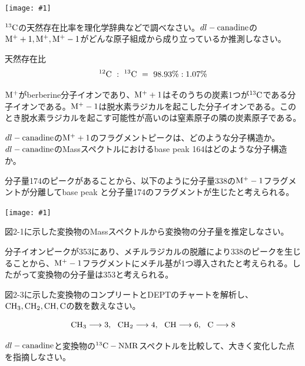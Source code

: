 \documentclass[a4paper,papersize,dvipdfmx]{jsarticle}
\newcommand{\pict}[2]{\begin{center} \texttt{[image: \#1]} \end{center}}   %
\begin{document}
\pict{imgs/kd04.jpeg}{12}

\begin{tcolorbox}[colback=white,colbacktitle=black,coltitle=white,title={問題5}]
$\rm ^{13}C$の天然存在比率を理化学辞典などで調べなさい。$dl-\rm canadine$の$\rm M^+ +1, M^+,M^+-1$がどんな原子組成から成り立っているか推測しなさい。
\end{tcolorbox}

天然存在比
\[\rm ^{12}C \ : \  ^{13}C \ = \ 98.93\% : 1.07\%\]


$\rm M^+$がberberine分子イオンであり、$\rm M^+ +1$はそのうちの炭素1つが$\rm ^{13}C$である分子イオンである。$\rm M^+-1$は脱水素ラジカルを起こした分子イオンである。このとき脱水素ラジカルを起こす可能性が高いのは窒素原子の隣の炭素原子である。

\begin{tcolorbox}[colback=white,colbacktitle=black,coltitle=white,title={問題6}]
$dl-\rm canadine$の$\rm M^+ +1$のフラグメントピークは、どのような分子構造か。$dl-\rm canadine$のMassスペクトルにおけるbase peak 164はどのような分子構造か。
\end{tcolorbox}

分子量174のピークがあることから、以下のように分子量338の$\rm M^+-1$フラグメントが分離してbase peak と分子量174のフラグメントが生じたと考えられる。

\pict{imgs/kd06.jpeg}{8}

\begin{tcolorbox}[colback=white,colbacktitle=black,coltitle=white,title={問題7}]
図2-1に示した変換物のMassスペクトルから変換物の分子量を推定しなさい。
\end{tcolorbox}

分子イオンピークが353にあり、メチルラジカルの脱離により338のピークを生じることから、$\rm M^+ -1$フラグメントにメチル基が1つ導入されたと考えられる。したがって変換物の分子量は353と考えられる。

\begin{tcolorbox}[colback=white,colbacktitle=black,coltitle=white,title={問題8}]
図2-3に示した変換物のコンプリートとDEPTのチャートを解析し、$\rm CH_3,CH_2, CH, C$の数を数えなさい。
\end{tcolorbox}

\[\rm CH_3\longrightarrow3,  \ \ CH_2 \longrightarrow4, \ \ CH \longrightarrow 6, \ \ C \longrightarrow 8\]

\begin{tcolorbox}[colback=white,colbacktitle=black,coltitle=white,title={問題9}]
$dl-\rm canadine$と変換物の$\rm ^{13}C-NMR$スペクトルを比較して、大きく変化した点を指摘しなさい。
\end{tcolorbox}
\end{document}
